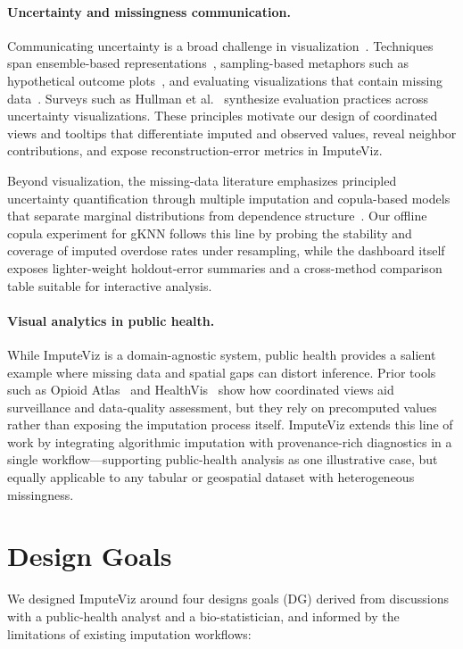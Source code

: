\documentclass[review]{vgtc}
\newcommand{\tool}{ImputeViz\xspace}
\begin{document}
\paragraph*{Uncertainty and missingness communication.}
Communicating uncertainty is a broad challenge in visualization~\cite{hullman2019authors}. Techniques span ensemble-based representations~\cite{potter2009ensemble}, sampling-based metaphors such as hypothetical outcome plots~\cite{Kale2019HOPsTrends}, and evaluating visualizations that contain missing data~\cite{song2018s}. Surveys such as Hullman et al.~\cite{hullman2018pursuit} synthesize evaluation practices across uncertainty visualizations. These principles motivate our design of coordinated views and tooltips that differentiate imputed and observed values, reveal neighbor contributions, and expose reconstruction-error metrics in ImputeViz.

Beyond visualization, the missing-data literature emphasizes principled uncertainty quantification through multiple imputation and copula-based models that separate marginal distributions from dependence structure~\cite{nelsen2006introduction,joe2014dependence,hollenbach2021multiple}. Our offline copula experiment for gKNN follows this line by probing the stability and coverage of imputed overdose rates under resampling, while the dashboard itself exposes lighter-weight holdout-error summaries and a cross-method comparison table suitable for interactive analysis.

\paragraph*{Visual analytics in public health.}
While ImputeViz is a domain-agnostic system, public health provides a salient example where missing data and spatial gaps can distort inference. Prior tools such as Opioid Atlas~\cite{sankaran2016opioid} and HealthVis~\cite{Carroll2014HealthVis} show how coordinated views aid surveillance and data-quality assessment, but they rely on precomputed values rather than exposing the imputation process itself. ImputeViz extends this line of work by integrating algorithmic imputation with provenance-rich diagnostics in a single workflow---supporting public-health analysis as one illustrative case, but equally applicable to any tabular or geospatial dataset with heterogeneous missingness.

\section{Design Goals}
We designed \tool around four designs goals (DG) derived from discussions with a public-health analyst and a bio-statistician, and informed by the limitations of existing imputation workflows:
\end{document}
